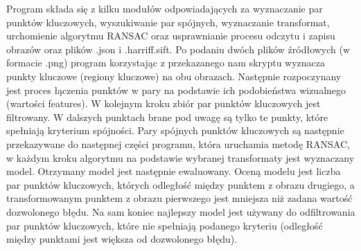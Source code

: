 \documentclass[../Sprawozdanie_4_SI.tex]{subfiles}
\begin{document}
    Program składa się z kilku modułów odpowiadających za wyznaczanie par punktów kluczowych, wyszukiwanie par spójnych, wyznaczanie transformat, urchomienie algorytmu RANSAC oraz usprawnianie procesu odczytu i zapisu obrazów oraz plików .json i .harriff.sift. Po podaniu dwóch plików źródłowych (w formacie .png) program korzystając z przekazanego nam skryptu wyznacza punkty kluczowe (regiony kluczowe) na obu obrazach. Następnie rozpoczynany jest proces łączenia punktów w pary na podstawie ich podobieństwa wizualnego (wartości features). W kolejnym kroku zbiór par punktów kluczowych jest filtrowany. W dalszych punktach brane pod uwagę są tylko te punkty, które spełniają kryterium spójności. Pary spójnych punktów kluczowych są następnie przekazywane do następnej części programu, która uruchamia metodę RANSAC, w każdym kroku algorytmu na podstawie wybranej transformaty jest wyznaczany model. Otrzymany model jest następnie ewaluowany. Oceną modelu jest liczba par punktów kluczowych, których odległość między punktem z obrazu drugiego, a transformowanym punktem z obrazu pierwszego jest mniejsza niż zadana wartość dozwolonego błędu. Na sam koniec najlepszy model jest używany do odfiltrowania par punktów kluczowych, które nie spełniają podanego kryteriu (odległość między punktami jest większa od dozwolonego błędu).
\end{document}
